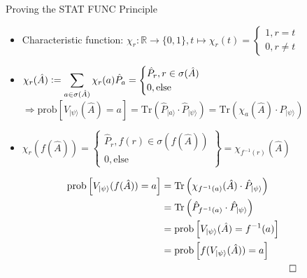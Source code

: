 \documentclass{beamer}
\newcommand{\defeq}{\vcentcolon=}
\newcommand{\R}{\mathbb{R}}
\begin{document}
\begin{frame}[allowframebreaks]{Proving the STAT FUNC Principle}
\begin{itemize}
\item Characteristic function: $\chi_{r}: \R\rightarrow \{0,1\}, t\mapsto\chi_{r}(t)=\begin{cases} 1, r=t\\ 0, r\neq t  \end{cases}$
\item $\chi_r(\hat A)\defeq \displaystyle\sum\limits_{a\in\sigma(\hat A)}\chi_{r}(a)\hat P_a=\begin{cases} \hat P_r, r\in\sigma(\hat A)\\ 0, \mathrm{else}  \end{cases}$\\
$\Rightarrow\mathrm{prob}\left[V_{|\psi\rangle}(\hat A)=a\right]=\mathrm{Tr}(\hat P_{|a\rangle}\cdot\hat P_{|\psi\rangle})=\mathrm{Tr}(\chi_a(\hat A)\cdot\hat P_{|\psi\rangle})$
\item $\chi_r(f(\hat A))=\left.\begin{cases} \hat P_r, f(r)\in\sigma(f(\hat A))\\ 0, \mathrm{else}\end{cases}\right\}=\chi_{f^{-1}(r)}(\hat A)$ %
\end{itemize}
\framebreak 
\begin{align*}
\mathrm{prob}\left[V_{|\psi\rangle}(f(\hat A))=a\right] &= \mathrm{Tr}\left( \chi_{f^{-1}(a)}(\hat A)\cdot \hat P_{|\psi\rangle}\right)\\ \quad&
										=  \mathrm{Tr}\left( \hat P_{f^{-1}(a)}\cdot \hat P_{|\psi\rangle}\right)\\ \quad&
										= \mathrm{prob}\left[V_{|\psi\rangle}(\hat A)=f^{-1}(a)\right] \\ \quad& 
										= \mathrm{prob}\left[f(V_{|\psi\rangle}(\hat A))=a\right]  \\ \quad& 
											&\hfill \square
\end{align*}	
\end{frame}
\end{document}
